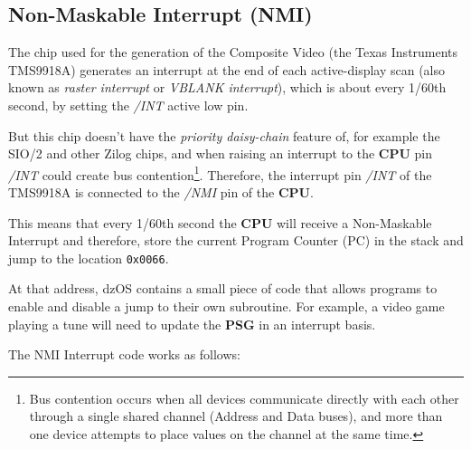 \documentclass[a4paper,11pt]{article}
\begin{document}
    \subsection{Non-Maskable Interrupt (NMI)}

    The chip used for the generation of the Composite Video (the Texas
    Instruments TMS9918A) generates an interrupt at the end of each
    active-display scan (also known as \textit{raster interrupt} or 
    \textit{VBLANK interrupt}), which is about every 1/60th second, by setting
    the \textit{/INT} active low pin.

    But this chip doesn't have the \textit{priority daisy-chain} feature of, for
    example the SIO/2 and other Zilog chips, and when raising an interrupt to
    the \textbf{CPU} pin \textit{/INT} could create bus contention\footnote{Bus
    contention occurs when all devices communicate directly with each other
    through a single shared channel (Address and Data buses), and more than one
    device attempts to place values on the channel at the same time.}. Therefore,
    the interrupt pin \textit{/INT} of the TMS9918A is connected to the
    \textit{/NMI} pin of the \textbf{CPU}.

    This means that every 1/60th second the \textbf{CPU} will receive a
    Non-Maskable Interrupt and therefore, store the current Program Counter (PC)
    in the stack and jump to the location \texttt{0x0066}.

    At that address, dzOS contains a small piece of code that allows programs to
    enable and disable a jump to their own subroutine. For example, a video game
    playing a tune will need to update the \textbf{PSG} in an interrupt basis.

    The NMI Interrupt code works as follows:
\end{document}
